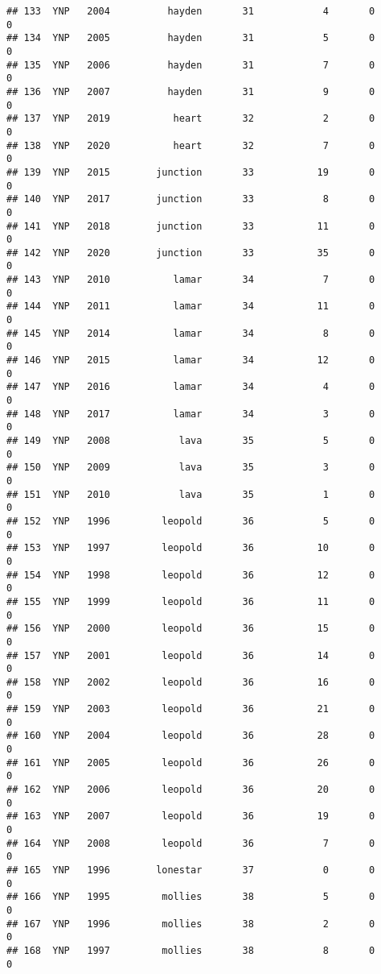 \documentclass[
]{article}
\begin{document}
\begin{verbatim}
## 133  YNP   2004          hayden       31            4       0        0
## 134  YNP   2005          hayden       31            5       0        0
## 135  YNP   2006          hayden       31            7       0        0
## 136  YNP   2007          hayden       31            9       0        0
## 137  YNP   2019           heart       32            2       0        0
## 138  YNP   2020           heart       32            7       0        0
## 139  YNP   2015        junction       33           19       0        0
## 140  YNP   2017        junction       33            8       0        0
## 141  YNP   2018        junction       33           11       0        0
## 142  YNP   2020        junction       33           35       0        0
## 143  YNP   2010           lamar       34            7       0        0
## 144  YNP   2011           lamar       34           11       0        0
## 145  YNP   2014           lamar       34            8       0        0
## 146  YNP   2015           lamar       34           12       0        0
## 147  YNP   2016           lamar       34            4       0        0
## 148  YNP   2017           lamar       34            3       0        0
## 149  YNP   2008            lava       35            5       0        0
## 150  YNP   2009            lava       35            3       0        0
## 151  YNP   2010            lava       35            1       0        0
## 152  YNP   1996         leopold       36            5       0        0
## 153  YNP   1997         leopold       36           10       0        0
## 154  YNP   1998         leopold       36           12       0        0
## 155  YNP   1999         leopold       36           11       0        0
## 156  YNP   2000         leopold       36           15       0        0
## 157  YNP   2001         leopold       36           14       0        0
## 158  YNP   2002         leopold       36           16       0        0
## 159  YNP   2003         leopold       36           21       0        0
## 160  YNP   2004         leopold       36           28       0        0
## 161  YNP   2005         leopold       36           26       0        0
## 162  YNP   2006         leopold       36           20       0        0
## 163  YNP   2007         leopold       36           19       0        0
## 164  YNP   2008         leopold       36            7       0        0
## 165  YNP   1996        lonestar       37            0       0        0
## 166  YNP   1995         mollies       38            5       0        0
## 167  YNP   1996         mollies       38            2       0        0
## 168  YNP   1997         mollies       38            8       0        0

\end{verbatim}
\end{document}
